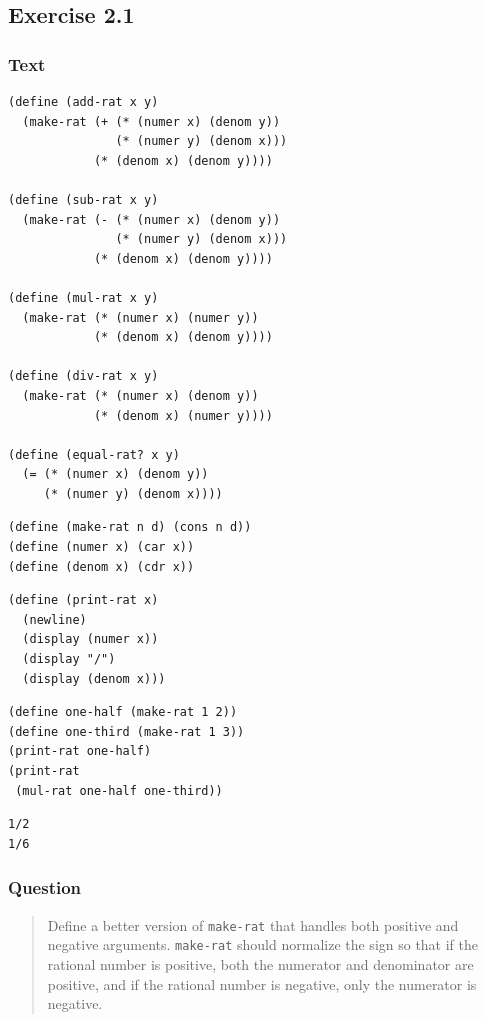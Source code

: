 \documentclass[final,fleqn,titlepage,twoside]{article}
\begin{document}
\subsection{Exercise 2.1}
\label{sec:org69c5f0a}
\subsubsection{Text}
\label{sec:org1a2e1d0}
\begin{verbatim}
(define (add-rat x y)
  (make-rat (+ (* (numer x) (denom y))
               (* (numer y) (denom x)))
            (* (denom x) (denom y))))

(define (sub-rat x y)
  (make-rat (- (* (numer x) (denom y))
               (* (numer y) (denom x)))
            (* (denom x) (denom y))))

(define (mul-rat x y)
  (make-rat (* (numer x) (numer y))
            (* (denom x) (denom y))))

(define (div-rat x y)
  (make-rat (* (numer x) (denom y))
            (* (denom x) (numer y))))

(define (equal-rat? x y)
  (= (* (numer x) (denom y))
     (* (numer y) (denom x))))
\end{verbatim}

\begin{verbatim}
(define (make-rat n d) (cons n d))
(define (numer x) (car x))
(define (denom x) (cdr x))
\end{verbatim}

\begin{verbatim}
(define (print-rat x)
  (newline)
  (display (numer x))
  (display "/")
  (display (denom x)))
\end{verbatim}

\begin{verbatim}
(define one-half (make-rat 1 2))
(define one-third (make-rat 1 3))
(print-rat one-half)
(print-rat
 (mul-rat one-half one-third))
\end{verbatim}
\begin{verbatim}
1/2
1/6
\end{verbatim}

\subsubsection{Question}
\label{sec:orgaaf3120}
\begin{quote}
Define a better version of \texttt{make-rat} that handles both positive and
negative arguments. \texttt{make-rat} should normalize the sign so that if
the rational number is positive, both the numerator and denominator are
positive, and if the rational number is negative, only the numerator is
negative.
\end{quote}
\end{document}
